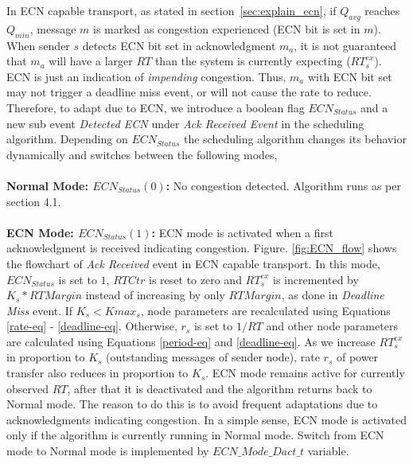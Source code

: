 	In ECN capable transport, as stated in section~\ref{sec:explain_ecn}, if $Q_{avg}$ reaches $Q_{min}$, message $m$ is marked as congestion experienced (ECN bit is set in $m$). When sender $s$ detects ECN bit set in acknowledgment $m_a$, it is not guaranteed that $m_a$ will have a larger $RT$ than the system is currently expecting ($RT_s^{ex}$). ECN is just an indication of \textit{impending}  congestion. Thus, $m_a$ with ECN bit set may not trigger a deadline miss event, or will not cause the rate to reduce.	Therefore, to adapt due to ECN, we introduce a boolean flag $ECN_{Status}$ and a new sub event \textit{Detected ECN} under \textit{Ack Received Event} in the scheduling algorithm. Depending on $ECN_{Status}$ the scheduling algorithm changes its behavior dynamically and switches between the following modes,\\\\
{\bf Normal Mode: $ECN_{Status}(0)$: } No congestion detected. Algorithm runs as per section 4.1.\\\\
{\bf ECN Mode: $ECN_{Status}(1)$: } ECN mode is activated when a first acknowledgment is received indicating congestion. Figure. \ref{fig:ECN_flow} shows the flowchart of \textit{Ack Received} event in ECN capable transport. In this mode, $ECN_{Status}$ is set to $1$, $RTCtr$ is reset to zero and $RT_s^{ex}$ is incremented by $K_s*RTMargin$ instead of increasing by only $RTMargin$, as done in \textit{Deadline Miss} event. If $K_s < Kmax_s$, node parameters are recalculated using Equations \ref{rate-eq} - \ref{deadline-eq}. Otherwise, $r_s$ is set to $1/RT$ and other node parameters are calculated using Equations \ref{period-eq} and \ref{deadline-eq}. As we increase $RT_s^{ex}$ in proportion to $K_s$ (outstanding messages of sender node), rate $r_s$ of power transfer also reduces in proportion to $K_s$. ECN mode remains active for currently observed $RT$, after that it is deactivated and the algorithm returns back to Normal mode. The reason to do this is to avoid frequent adaptations due to acknowledgments indicating congestion. In a simple sense, ECN mode is activated only if the algorithm is currently running in Normal mode. Switch from ECN mode to Normal mode is implemented by $ECN\_Mode\_Dact\_t$ variable. \\


